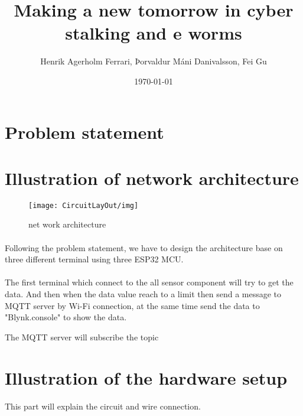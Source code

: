 \documentclass[12pt, a4, utf8]{report}        %
\title{Making a new tomorrow in cyber stalking and e worms}                                   %
\author{Henrik Agerholm Ferrari, Þorvaldur Máni Danivalsson, Fei Gu}
\date{\today}
\begin{document}
    \maketitle
    \tableofcontents


    \section{Problem statement}\label{sec:problem-statement}
    \blindtext{}


    \section{Illustration of network architecture}\label{sec:illustration-of-network-architecture}

    \begin{figure}
        \centering
        \texttt{[image: CircuitLayOut/img]}
        \caption{net work architecture}
        \label{fig:}
    \end{figure}
    \paragraph{}
    Following the problem statement, we have to design the architecture base on three different terminal using three ESP32 MCU.


    \paragraph{}
    The first terminal which connect to the all sensor component will try to get the data.
    And then when the data value reach to a limit then send a message to MQTT server by Wi-Fi connection, at the
    same time send the data to "Blynk.console" to show the data.


    \paragrapg{}
    The MQTT server will subscribe the topic

    \blindtext{}

    \section{Illustration of the hardware setup}\label{sec:illustration-of-the-hardware-setup}
    \paragraph{}
    This part will explain the circuit and wire connection.
\end{document}
